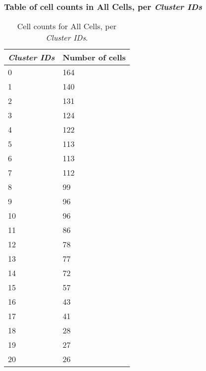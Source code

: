 \subsubsection{Table of cell counts in All Cells, per \emph{Cluster IDs}}\begin{table}[h]
\centering
\label{my-label}
\begin{tabular}{@{}ll@{}}
\toprule

\emph{Cluster IDs}& Number of cells \\ \midrule
0 & 164 \\

1 & 140 \\

2 & 131 \\

3 & 124 \\

4 & 122 \\

5 & 113 \\

6 & 113 \\

7 & 112 \\

8 & 99 \\

9 & 96 \\

10 & 96 \\

11 & 86 \\

12 & 78 \\

13 & 77 \\

14 & 72 \\

15 & 57 \\

16 & 43 \\

17 & 41 \\

18 & 28 \\

19 & 27 \\

20 & 26 \\
\bottomrule
\end{tabular}
\caption{Cell counts for All Cells, per \emph{Cluster IDs}.}
\end{table}


